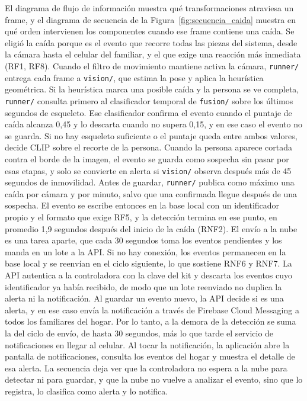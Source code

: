 El diagrama de flujo de información muestra qué transformaciones atraviesa un frame, y el diagrama de secuencia de la Figura~\ref{fig:secuencia_caida} muestra en qué orden intervienen los componentes cuando ese frame contiene una caída.
Se eligió la caída porque es el evento que recorre todas las piezas del sistema, desde la cámara hasta el celular del familiar, y el que exige una reacción más inmediata (RF1, RF8).
Cuando el filtro de movimiento mantiene activa la cámara, \texttt{runner/} entrega cada frame a \texttt{vision/}, que estima la pose y aplica la heurística geométrica.
Si la heurística marca una posible caída y la persona se ve completa, \texttt{runner/} consulta primero al clasificador temporal de \texttt{fusion/} sobre los últimos segundos de esqueleto.
Ese clasificador confirma el evento cuando el puntaje de caída alcanza 0,45 y lo descarta cuando no supera 0,15, y en ese caso el evento no se guarda.
Si no hay esqueleto suficiente o el puntaje queda entre ambos valores, decide CLIP sobre el recorte de la persona.
Cuando la persona aparece cortada contra el borde de la imagen, el evento se guarda como sospecha sin pasar por esas etapas, y solo se convierte en alerta si \texttt{vision/} observa después más de 45 segundos de inmovilidad.
Antes de guardar, \texttt{runner/} publica como máximo una caída por cámara y por minuto, salvo que una confirmada llegue después de una sospecha.
El evento se escribe entonces en la base local con un identificador propio y el formato que exige RF5, y la detección termina en ese punto, en promedio 1,9 segundos después del inicio de la caída (RNF2).
El envío a la nube es una tarea aparte, que cada 30 segundos toma los eventos pendientes y los manda en un lote a la API.
Si no hay conexión, los eventos permanecen en la base local y se reenvían en el ciclo siguiente, lo que sostiene RNF6 y RNF7.
La API autentica a la controladora con la clave del kit y descarta los eventos cuyo identificador ya había recibido, de modo que un lote reenviado no duplica la alerta ni la notificación.
Al guardar un evento nuevo, la API decide si es una alerta, y en ese caso envía la notificación a través de Firebase Cloud Messaging a todos los familiares del hogar.
Por lo tanto, a la demora de la detección se suma la del ciclo de envío, de hasta 30 segundos, más lo que tarde el servicio de notificaciones en llegar al celular.
Al tocar la notificación, la aplicación abre la pantalla de notificaciones, consulta los eventos del hogar y muestra el detalle de esa alerta.
La secuencia deja ver que la controladora no espera a la nube para detectar ni para guardar, y que la nube no vuelve a analizar el evento, sino que lo registra, lo clasifica como alerta y lo notifica.

